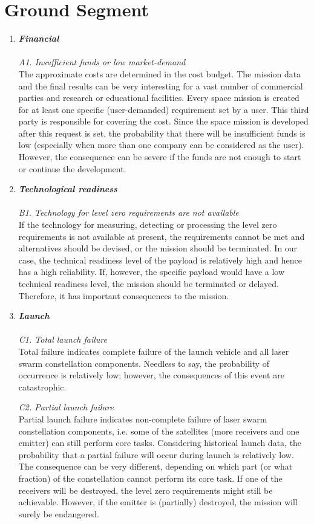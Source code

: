 \section{Ground Segment}
\label{blTRAGs}
\begin{enumerate}[A]
	\item  \textbf{\textit{Financial}} \\\\
\textit{A1. Insufficient funds or low market-demand}\\
The approximate costs are determined in the cost budget. The mission data and the final results can be very interesting for a vast number of commercial parties and research or educational facilities. Every space mission is created for at least one specific (user-demanded) requirement set by a user. This third party is responsible for covering the cost. Since the space mission is developed after this request is set, the probability that there will be insufficient funds is low (especially when more than one company can be considered as the user). However, the consequence can be severe if the funds are not enough to start or continue the development. 

	\item  \textbf{\textit{Technological readiness}} \\\\
\textit{B1. Technology for level zero requirements are not available}\\
If the technology for measuring, detecting or processing the level zero requirements is 	not available at present, the requirements cannot be met and alternatives should be devised, or the mission should be terminated. In our case, the technical readiness level of the 	payload is relatively high and hence has a high reliability. If, however, the specific 	payload would have a low technical readiness level, the mission should be terminated or 	delayed. Therefore, it has important consequences to the mission.

	\item  \textbf{\textit{Launch}} \\\\
\textit{C1. Total launch failure}\\
Total failure indicates complete failure of the launch vehicle and all laser swarm 	constellation components. Needless to say, the probability of occurrence is relatively low; however, the consequences of this event are catastrophic.

\textit{C2. Partial launch failure}\\
Partial launch failure indicates non-complete failure of laser swarm constellation components, i.e. some of the satellites (more receivers and one emitter) can still perform core tasks. Considering historical launch data, the probability that a partial failure will occur during launch is relatively low. The consequence can be very different, depending on which part (or what fraction) of the constellation cannot perform its core task. If one of the receivers will be destroyed, the level zero requirements might still be achievable. However, if the emitter is (partially) destroyed, the mission will surely be endangered. 


\end{enumerate}
